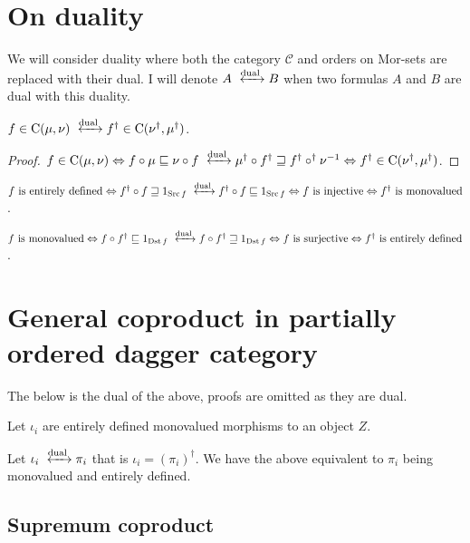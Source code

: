 \section{On duality}

We will consider duality where both the category $\mathcal{C}$ and orders on
Mor-sets are replaced with their dual. I will denote $A
\xleftrightarrow{\dual} B$ when two formulas $A$ and $B$ are dual with
this duality.

\begin{prop}
  $f \in \mathrm{C} (\mu, \nu) \xleftrightarrow{\dual} f^{\dagger}
  \in \mathrm{C} (\nu^{\dagger} , \mu^{\dagger})$.
\end{prop}

\begin{proof}
  $f \in \mathrm{C} (\mu, \nu) \Leftrightarrow f \circ \mu
  \sqsubseteq \nu \circ f \xleftrightarrow{\dual} \mu^{\dagger}
  \circ f^{\dagger} \sqsupseteq f^{\dagger} \circ^{\dagger} \nu^{- 1}
  \Leftrightarrow f^{\dagger} \in \mathrm{C} (\nu^{\dagger} ,
  \mu^{\dagger})$.
\end{proof}

$f \text{ is entirely defined} \Leftrightarrow f^{\dagger} \circ f \sqsupseteq
1_{\Src f} \xleftrightarrow{\dual} f^{\dagger} \circ f \sqsubseteq
1_{\Src f} \Leftrightarrow f \text{ is injective} \Leftrightarrow
f^{\dagger} \text{ is monovalued}$.

$f \text{ is monovalued} \Leftrightarrow f \circ f^{\dagger} \sqsubseteq
1_{\Dst f} \xleftrightarrow{\dual} f \circ f^{\dagger} \sqsupseteq
1_{\Dst f} \Leftrightarrow f \text{ is surjective} \Leftrightarrow
f^{\dagger} \text{ is entirely defined}$.

\section{General coproduct in partially ordered dagger category}

The below is the dual of the above, proofs are omitted as they are dual.

Let $\iota_i$  are entirely defined monovalued morphisms to an object $Z$.

Let $\iota_i \xleftrightarrow{\dual} \pi_i$ that is $\iota_i =
(\pi_i)^{\dagger}$. We have the above equivalent to $\pi_i$ being monovalued
and entirely defined.

\subsection{Supremum coproduct}

